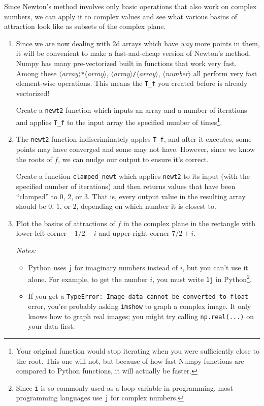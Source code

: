 \documentclass[letter]{article}
\newcommand{\var}[1]{{$\langle$\it #1$\rangle$}}
\begin{document}
\begin{enumerate}
			Since Newton's method involves only basic operations that also work on complex numbers,
			we can apply it to complex values and see what various basins of attraction look like as subsets of
			the complex plane.
			\begin{enumerate}
				\item Since we are now dealing with 2d arrays which have \emph{way} more points in them,
					it will be convenient to make a fast-and-cheap version of Newton's method. Numpy
					has many pre-vectorized built in functions that work very fast. Among these
					\var{array}\verb|*|\var{array}, \var{array}\verb|/|\var{array}, \var{number}\pm\var{array}
					all perform very fast element-wise operations. This means the \verb|T_f| you created before
					is already vectorized!

					Create a \verb|newt2| function which inputs an array and a number of iterations
					and applies \verb|T_f| to the input array the specified number of times\footnote{ Your original
					function would stop iterating when you were sufficiently close to the root. This one will not,
					but because of how fast Numpy functions are compared to Python functions, it will actually
					be faster.}.
				\item The \verb|newt2| function indiscriminately apples \verb|T_f|, and after it executes, some points may
					have converged and some may not have. However, since we know the roots of $f$, we 
					can nudge our output
					to ensure it's correct.

					Create a function \verb|clamped_newt| which applies \verb|newt2| to its input 
					(with the specified number of iterations) and then returns values that have been ``clamped''
					to $0$, $2$, or $3$. That is, every output value in the resulting array should be $0$, $1$, or $2$,
					depending on which number it is closest to.

				\item Plot the basins of attractions of $f$ in the complex plane in the rectangle with lower-left corner
					$-1/2-i$ and upper-right corner $7/2+i$. 

					\emph{Notes:}
					\begin{itemize}
						\item Python uses {\tt j} for imaginary numbers
					instead of $i$, but you can't use it alone. For example, to get the number $i$, you must
							write {\tt 1j} in Python\footnote{ Since {\tt i} is so commonly used
							as a loop variable in programming, most programming languages use {\tt j}
							for complex numbers.}.
						\item If you get a {\tt TypeError: Image data cannot be converted to float}
					error, you're probably asking {\tt imshow} to graph a complex image. It only knows how to graph
					real images; you might try calling {\tt np.real(...)} on your data first.
					\end{itemize}


\end{enumerate}
\end{enumerate}
\end{document}
